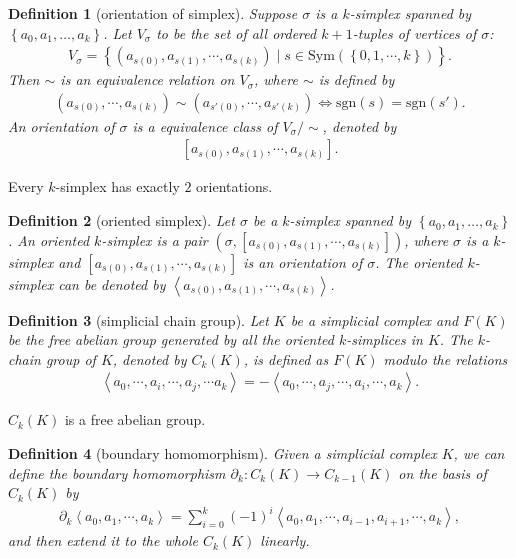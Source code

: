 \documentclass{report}
\newtheorem{definition}{Definition}[section]
\theoremstyle{nonumberplain}
\begin{document}
\begin{definition}[orientation of simplex]
	Suppose $\sigma$ is a $k$-simplex spanned by $\left\{a_0, a_1, \ldots, a_k\right\}$. Let $V_{\sigma}$ to be the set of all ordered $k+1$-tuples of vertices of $\sigma$:
	\begin{align*}
		V_{\sigma}=\left\{\left(a_{s(0)},a_{s(1)},\cdots,a_{s(k)}\right)\mid s\in \mathrm{Sym}\left(\left\{0,1,\cdots,k\right\}\right)\right\}.
	\end{align*}
	Then $\sim$ is an equivalence relation on $V_{\sigma}$, where $\sim$ is defined by
	\begin{align*}
		\left(a_{s(0)},\cdots,a_{s(k)}\right)\sim\left(a_{s'(0)},\cdots,a_{s'(k)}\right)\iff \mathrm{sgn}(s)=\mathrm{sgn}(s').
	\end{align*}
	An orientation of $\sigma$ is a equivalence class of $V_{\sigma}/\sim$, denoted by
	\begin{align*}
		\left[a_{s(0)},a_{s(1)},\cdots,a_{s(k)}\right].
	\end{align*}
\end{definition}
Every $k$-simplex has exactly $2$ orientations.
\begin{definition}[oriented simplex]
	Let $\sigma$ be a $k$-simplex spanned by $\left\{a_0, a_1, \ldots, a_k\right\}$. An \emph{oriented $k$-simplex} is a pair $\left(\sigma, \left[a_{s(0)},a_{s(1)},\cdots,a_{s(k)}\right]\right)$, where $\sigma$ is a $k$-simplex and $\left[a_{s(0)},a_{s(1)},\cdots,a_{s(k)}\right]$ is an orientation of $\sigma$. The oriented $k$-simplex can be denoted by $\left\langle a_{s(0)},a_{s(1)},\cdots,a_{s(k)}\right\rangle$.
\end{definition}

\begin{definition}[simplicial chain group]
	Let $K$ be a simplicial complex and $F(K)$ be the free abelian group generated by all the oriented $k$-simplices in $K$. The $k$\emph{-chain group} of $K$, denoted by $C_k(K)$, is defined as $F(K)$ modulo the relations
	\begin{align*}
		\left\langle a_{0}, \cdots ,a_{i},\cdots,a_{j},\cdots a_{k}\right\rangle=-\left\langle a_{0},\cdots ,a_{j},\cdots,a_{i},\cdots,a_{k}\right\rangle.
	\end{align*}
\end{definition}
$C_k(K)$ is a free abelian group.
\begin{definition}[boundary homomorphism]
	Given a simplicial complex $K$, we can define the boundary homomorphism $\partial_k:C_k(K)\rightarrow C_{k-1}(K)$ on the basis of $C_k(K)$ by
	\begin{align*}
		\partial_k\left\langle a_{0},a_{1},\cdots,a_{k}\right\rangle=\sum_{i=0}^k(-1)^{i}\left\langle a_{0},a_{1},\cdots,a_{i-1},a_{i+1},\cdots,a_{k}\right\rangle,
	\end{align*}
	and then extend it to the whole $C_k(K)$ linearly.
\end{definition}
\end{document}
